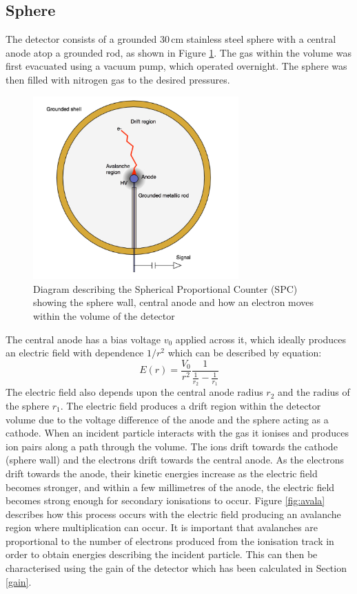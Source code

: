 \documentclass[a4paper]{article}
\begin{document}
\subsection{Sphere}
The detector consists of a grounded 30\,cm stainless steel sphere with a central anode atop a grounded rod, as shown in Figure \ref{fig:sphere}. The gas within the volume was first evacuated using a vacuum pump, which operated overnight. The sphere was then filled with nitrogen gas to the desired pressures. 
\begin{figure}[H]
    \centering
    \includegraphics[height=7cm]{plots/sphere.png}
    \caption{Diagram describing the Spherical Proportional Counter (SPC) showing the sphere wall, central anode and how an electron moves within the volume of the detector\cite{savvidis2017low}}
    \label{fig:sphere}
\end{figure}
\noindent The central anode has a bias voltage $v_0$ applied across it, which ideally produces an electric field with dependence $1/r^2$ which can be described by equation:
\begin{equation}
    E(r) = \frac{V_0}{r^2}\frac{1}{\frac{1}{r_2}-\frac{1}{r_1}}
\end{equation}
The electric field also depends upon the central anode radius $r_2$ and the radius of the sphere $r_1$. The electric field produces a drift region within the detector volume due to the voltage difference of the anode and the sphere acting as a cathode. When an incident particle interacts with the gas it ionises and produces ion pairs along a path through the volume. The ions drift towards the cathode (sphere wall) and the electrons drift towards the central anode. As the electrons drift towards the anode, their kinetic energies increase as the electric field becomes stronger, and within a few millimetres of the anode, the electric field becomes strong enough for secondary ionisations to occur. Figure \ref{fig:avala} describes how this process occurs with the electric field producing an avalanche region where multiplication can occur. It is important that avalanches are proportional to the number of electrons produced from the ionisation track in order to obtain energies describing the incident particle. This can then be characterised using the gain of the detector which has been calculated in Section \ref{gain}.
\end{document}
